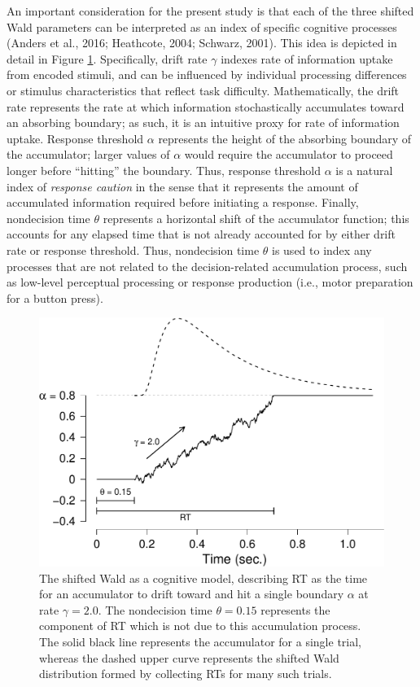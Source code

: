 \documentclass[english,,man]{apa6}
\theoremstyle{definition}
\theoremstyle{definition}
\theoremstyle{definition}
\theoremstyle{remark}
\begin{document}
An important consideration for the present study is that each of the
three shifted Wald parameters can be interpreted as an index of specific
cognitive processes (Anders et al., 2016; Heathcote, 2004; Schwarz,
2001). This idea is depicted in detail in Figure
\ref{fig:accumulatorFig}. Specifically, drift rate \(\gamma\) indexes
rate of information uptake from encoded stimuli, and can be influenced
by individual processing differences or stimulus characteristics that
reflect task difficulty. Mathematically, the drift rate represents the
rate at which information stochastically accumulates toward an absorbing
boundary; as such, it is an intuitive proxy for rate of information
uptake. Response threshold \(\alpha\) represents the height of the
absorbing boundary of the accumulator; larger values of \(\alpha\) would
require the accumulator to proceed longer before \enquote{hitting} the
boundary. Thus, response threshold \(\alpha\) is a natural index of
\emph{response caution} in the sense that it represents the amount of
accumulated information required before initiating a response. Finally,
nondecision time \(\theta\) represents a horizontal shift of the
accumulator function; this accounts for any elapsed time that is not
already accounted for by either drift rate or response threshold. Thus,
nondecision time \(\theta\) is used to index any processes that are not
related to the decision-related accumulation process, such as low-level
perceptual processing or response production (i.e., motor preparation
for a button press).

\begin{figure}
\centering
\includegraphics{paper_files/figure-latex/accumulatorFig-1.pdf}
\caption{\label{fig:accumulatorFig}The shifted Wald as a cognitive model,
describing RT as the time for an accumulator to drift toward and hit a
single boundary \(\alpha\) at rate \(\gamma =2.0\). The nondecision time
\(\theta =0.15\) represents the component of RT which is not due to this
accumulation process. The solid black line represents the accumulator
for a single trial, whereas the dashed upper curve represents the
shifted Wald distribution formed by collecting RTs for many such
trials.}
\end{figure}
\end{document}
